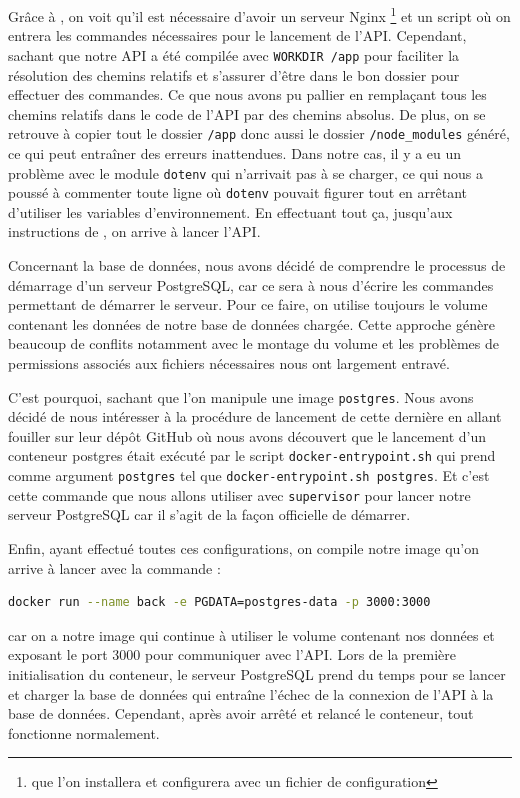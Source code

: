 Gr\^ace \`a \cite{node-supervisor}, on voit qu'il est n\'ecessaire d'avoir un serveur Nginx \footnote{que l'on installera et configurera avec un fichier de configuration} et un script o\`u on entrera les commandes n\'ecessaires pour le lancement de l'API. Cependant, sachant que notre API 
a \'et\'e compil\'ee avec \lstinline{WORKDIR /app} pour faciliter la r\'esolution des chemins relatifs et s'assurer d'\^etre dans le bon dossier pour effectuer des commandes. Ce que nous avons pu pallier en rempla\c{c}ant tous les chemins relatifs dans le code de l'API par des chemins absolus. 
De plus, on se retrouve \`a copier tout le dossier \lstinline{/app} donc aussi le dossier \lstinline{/node_modules} g\'en\'er\'e, ce qui peut entra\^iner des erreurs inattendues. Dans notre cas, il y a eu un probl\`eme avec le module \lstinline{dotenv} qui n'arrivait pas \`a se charger, ce qui 
nous a pouss\'e \`a commenter toute ligne o\`u \lstinline{dotenv} pouvait figurer tout en arr\^etant d'utiliser les variables d'environnement. En effectuant tout \c{c}a, jusqu'aux instructions de \cite{node-supervisor}, on arrive \`a lancer l'API.

Concernant la base de donn\'ees, nous avons d\'ecid\'e de comprendre le processus de d\'emarrage d'un serveur PostgreSQL, car ce sera \`a nous d'\'ecrire les commandes permettant de d\'emarrer le serveur. Pour ce faire, on utilise toujours le volume contenant les donn\'ees de notre base de donn\'ees charg\'ee. 
Cette approche g\'en\`ere beaucoup de conflits notamment avec le montage du volume et les probl\`emes de permissions associ\'es aux fichiers n\'ecessaires nous ont largement entrav\'e. 

C'est pourquoi, sachant que l'on manipule une image \lstinline{postgres}. Nous avons d\'ecid\'e de nous int\'eresser \`a la proc\'edure de lancement de cette derni\`ere en allant fouiller sur leur d\'ep\^ot GitHub \cite{postgres-docker-repo} o\`u nous avons d\'ecouvert que le lancement d'un conteneur postgres 
\'etait ex\'ecut\'e par le script \lstinline{docker-entrypoint.sh} qui prend comme argument \lstinline{postgres} tel que \lstinline[breaklines]{docker-entrypoint.sh postgres}. Et c'est cette commande que nous allons utiliser avec \lstinline{supervisor} pour lancer notre serveur PostgreSQL 
car il s'agit de la fa\c{c}on officielle de d\'emarrer.

Enfin, ayant effectu\'e toutes ces configurations, on compile notre image qu'on arrive \`a lancer avec la commande :
\begin{lstlisting}[frame=single, language=bash, breaklines]
docker run --name back -e PGDATA=postgres-data -p 3000:3000 
\end{lstlisting} 
car on a notre image qui continue \`a utiliser le volume contenant nos donn\'ees et exposant le port 3000 pour communiquer avec l'API. Lors de la premi\`ere initialisation du conteneur, le serveur PostgreSQL prend du temps pour se lancer et 
charger la base de donn\'ees qui entra\^ine l'\'echec de la connexion de l'API \`a la base de donn\'ees. Cependant, apr\`es avoir arr\^et\'e et relanc\'e le conteneur, tout fonctionne normalement.
